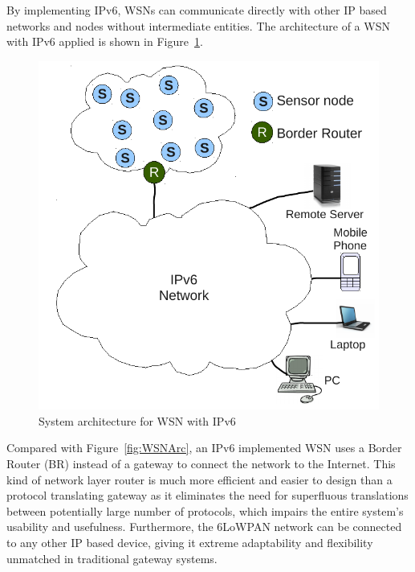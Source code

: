 By implementing IPv6, WSNs can communicate directly with other IP based networks and nodes without intermediate entities. The architecture of a WSN with IPv6 applied is shown in Figure~\ref{fig:Ipv6WSNArc}.
\begin{figure}[htbp]
  \begin{center}
    \leavevmode
      \includegraphics[scale=0.4]
      {Pics/Ipv6WSNArc.pdf}
   \caption{System architecture for WSN with IPv6}
    \label{fig:Ipv6WSNArc}
  \end{center}
\end{figure}

Compared with  Figure~\ref{fig:WSNArc}, an IPv6 implemented WSN uses a Border Router (BR) instead of a gateway  to connect the network to the Internet. This kind of network layer router is much more efficient and easier to design than a protocol translating gateway as it eliminates the need for superfluous translations between potentially large number of protocols, which impairs the entire system's usability and usefulness. Furthermore, the 6LoWPAN network can be connected to any other IP based device, giving it extreme adaptability and flexibility unmatched in traditional gateway systems. 
\newline

